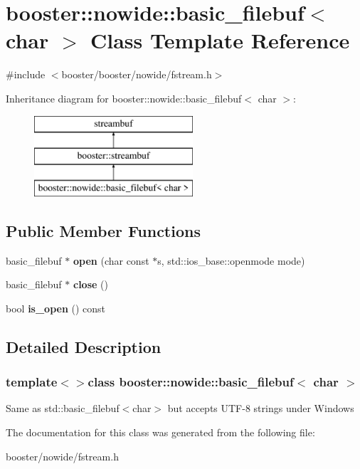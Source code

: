 \section{booster\-:\-:nowide\-:\-:basic\-\_\-filebuf$<$ char $>$ \-Class \-Template \-Reference}
\label{classbooster_1_1nowide_1_1basic__filebuf_3_01char_01_4}


{\ttfamily \#include $<$booster/booster/nowide/fstream.\-h$>$}

\-Inheritance diagram for booster\-:\-:nowide\-:\-:basic\-\_\-filebuf$<$ char $>$\-:\begin{figure}[H]
\begin{center}
\leavevmode
\includegraphics[height=3.000000cm]{classbooster_1_1nowide_1_1basic__filebuf_3_01char_01_4}
\end{center}
\end{figure}
\subsection*{\-Public \-Member \-Functions}
\begin{DoxyCompactItemize}
\item 
basic\-\_\-filebuf $\ast$ {\bfseries open} (char const $\ast$s, std\-::ios\-\_\-base\-::openmode mode)\label{classbooster_1_1nowide_1_1basic__filebuf_3_01char_01_4_af53fd41ad94523460647b3a95411a548}

\item 
basic\-\_\-filebuf $\ast$ {\bfseries close} ()\label{classbooster_1_1nowide_1_1basic__filebuf_3_01char_01_4_aae0ace743846530c663c267010470126}

\item 
bool {\bfseries is\-\_\-open} () const \label{classbooster_1_1nowide_1_1basic__filebuf_3_01char_01_4_a8c0ba603f3592a54d624e0d91bfab624}

\end{DoxyCompactItemize}


\subsection{\-Detailed \-Description}
\subsubsection*{template$<$$>$class booster\-::nowide\-::basic\-\_\-filebuf$<$ char $>$}

\-Same as std\-::basic\-\_\-filebuf$<$char$>$ but accepts \-U\-T\-F-\/8 strings under \-Windows 

\-The documentation for this class was generated from the following file\-:\begin{DoxyCompactItemize}
\item 
booster/nowide/fstream.\-h\end{DoxyCompactItemize}
